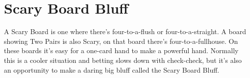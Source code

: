 \section{Scary Board Bluff}

A Scary Board is one where there's four-to-a-flush or four-to-a-straight.
A board showing Two Pairs is also Scary, on that board there's
four-to-a-fullhouse.  On these boards it's easy for a one-card hand
to make a powerful hand. Normally this is a cooler situation and
betting slows down with check-check, but it's also an opportunity
to make a daring big bluff called the Scary Board Bluff.
